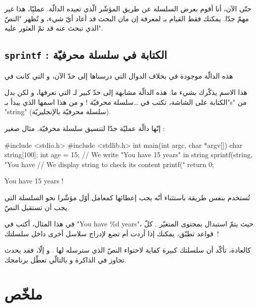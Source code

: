 حتّى الآن، أنا أقوم بعرض السلسلة عن طريق المؤشّر الّذي تعيده الدالّة. عمليّا، هذا غير مهمّ جدّا. يمكنك فقط القيام بـ
لمعرفة إن مان البحث قد أعاد أيّ شيء، و تُظهر "النصّ الذي تبحث عنه قد تمّ العثور عليه".

\subsection{\texttt{sprintf} : الكتابة في سلسلة محرفيّة}

\begin{information}
  هذه الدالّة موجودة في
  بخلاف الدوال التي درسناها إلى حدّ الآن، و التي كانت في
\end{information}

هذا الاسم يذكّرك بشيء ما. هذه الدالّة مشابهة إلى حدّ كبير لـ
التي تعرفها، و لكن بدل الكتابة على الشاشة،
تكتب في \dots سلسلة محرفيّة ! و من هذا اسمها الذي يبدأ بـ"\textenglish{s}" من "\textenglish{string}" (سلسلة محرفيّة بالإنجليزيّة).

إنّها دالّة عمليّة جدّا لتنسيق سلسلة محرفيّة. مثال صغير :

\begin{Csource}
#include <stdio.h>
#include <stdlib.h>
int main(int argc, char *argv[])
{
	char string[100];
	int age = 15;
	// We write "You have 15 years" in string
	sprintf(string, "You have %
	// We display string to check its content
	printf("%
	return 0;
}
\end{Csource}

\begin{Console}
You have 15 years !
\end{Console}

تُستخدم بنفس طريقة
باستثناء أنّه يجب إعطائها كمعامل أوّل مؤشّرا نحو السلسلة التي يجب أن تستقبل النصّ.

في هذا المثال، أكتب في
"\textenglish{You have \%d years}"،
حيث يتمّ استبدال
بمحتوى المتغيّر
.
كلّ قواعد
تطبّق، يمكنك إذا أردت أم تضع
لإدراج سلاسل أخرى داخل سلسلتك~!

كالعادة، تأكّد أن سلسلتك كبيرة كفاية لاحتواء النصّ الذي سترسله لها
.
و إلّا، فقد يحدث تجاوز في الذاكرة و بالتالّي تعطّل برنامجك.

\section*{ملخّص}

